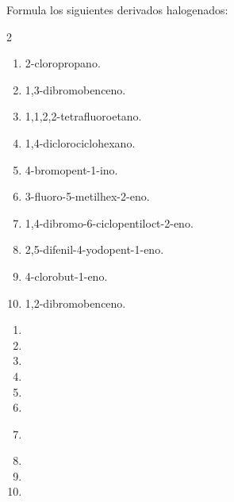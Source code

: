 \begin{exercise}
    Formula los siguientes derivados halogenados:
    \begin{multicols}{2}
        \begin{enumerate}[label=\alph*)]
            \item 2-cloropropano.
            \item 1,3-dibromobenceno.
            \item 1,1,2,2-tetrafluoroetano.
            \item 1,4-diclorociclohexano.
            \item 4-bromopent-1-ino.
            \item 3-fluoro-5-metilhex-2-eno.
            \item 1,4-dibromo-6-ciclopentiloct-2-eno.
            \item 2,5-difenil-4-yodopent-1-eno.
            \item 4-clorobut-1-eno.
            \item 1,2-dibromobenceno.
        \end{enumerate}
    \end{multicols}
    \begin{solu}
        \begin{enumerate}[label=\alph*)]
            \item {}
            \item {}
            \item {}
            \item {}
            \item {}
            \item {}
            \item {}\\
            \item {}
            \item {}
            \item {}
        \end{enumerate}
    \end{solu}
\end{exercise}

